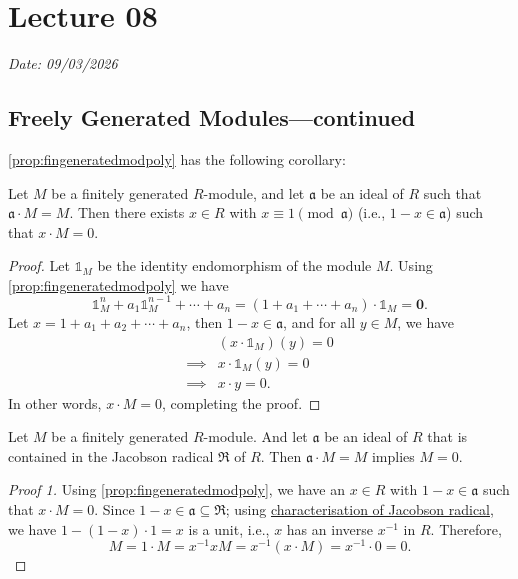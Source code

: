 \chapter{Lecture 08}
\hfill {\footnotesize \textit{Date: 09/03/2026}}
\section{Freely Generated Modules---continued}
\autoref{prop:fingeneratedmodpoly} has the following corollary:
\begin{corollary}
    Let \(M\) be a finitely generated \(R\)-module, and let \(\mathfrak{a}\) be an ideal of \(R\) such that \(\mathfrak{a}\cdot M = M\). Then there exists \(x \in R\) with \(x \equiv 1 \pmod{\mathfrak{a}}\) (i.e., \(1 - x \in \mathfrak{a}\)) such that \(x \cdot M = 0\).
\end{corollary}
\begin{proof}
    Let \(\mathds{1}_M\) be the identity endomorphism of the module \(M\). Using \autoref{prop:fingeneratedmodpoly} we have 
    \[
    \mathds{1}_M^n + a_1 \mathds{1}_M^{n-1} + \cdots + a_n = (1 + a_1+\cdots + a_n)\cdot \mathds{1}_M= \mathbf{0}.
    \]
    Let \(x = 1 + a_1 + a_2 + \cdots + a_n\), then \( 1 - x \in \mathfrak{a} \), and for all \(y \in M\), we have
    \begin{align*}
        &(x\cdot \mathds{1}_M)(y) = 0\\
        \implies &x \cdot \mathds{1}_M(y) = 0\\
        \implies & x \cdot y = 0.
    \end{align*}
    In other words, \(x \cdot M = 0\), completing the proof. 
\end{proof}
\begin{lemma}\label{lemma:nakayama}
    Let \(M\) be a finitely generated \(R\)-module. And let \(\mathfrak{a}\) be an ideal of \(R\) that is contained in the Jacobson radical \(\mathfrak{R}\) of \(R\). Then \(\mathfrak{a} \cdot M = M\) implies \(M = 0\).
\end{lemma}
\begin{proof}[Proof 1]
    Using \autoref{prop:fingeneratedmodpoly}, we have an \(x \in R\) with \(1 - x \in \mathfrak{a}\) such that \(x \cdot M = 0\). Since \(1 - x \in \mathfrak{a} \subseteq \mathfrak{R}\); using \hyperref[thm:characterisationOfJacobsonRad]{characterisation of Jacobson radical}, we have \(1 - (1-x)\cdot 1= x\) is a unit, i.e., \(x\) has an inverse \(x^{-1}\) in \(R\). Therefore, 
    \[
    M = 1\cdot M = x^{-1}x M = x^{-1} (x \cdot M) = x^{-1} \cdot 0 = 0.
    \]
\end{proof}
